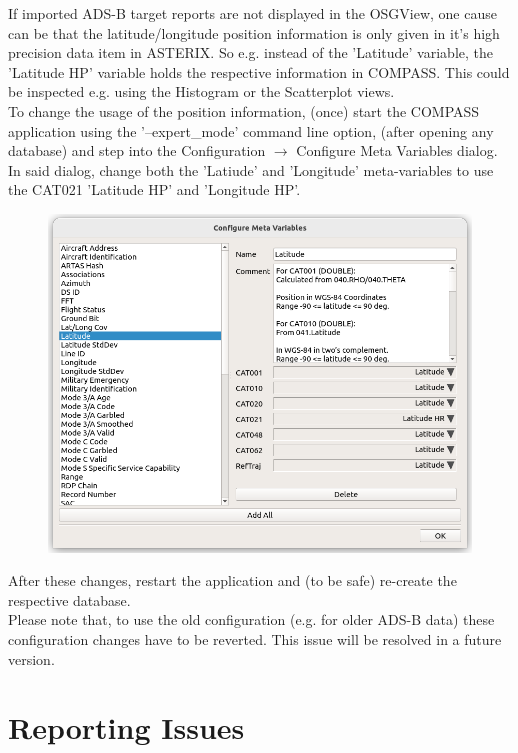 If imported ADS-B target reports are not displayed in the OSGView, one cause can be that the latitude/longitude position information is only given in it's high precision data item in ASTERIX. So e.g. instead of the 'Latitude' variable, the 'Latitude HP' variable holds the respective information in COMPASS. This could be inspected e.g. using the Histogram or the Scatterplot views. \\

To change the usage of the position information, (once) start the COMPASS application using the '--expert\_mode' command line option, (after opening any database) and step into the Configuration $\rightarrow$ Configure Meta Variables dialog. \\

In said dialog, change both the 'Latiude' and 'Longitude' meta-variables to use the CAT021 'Latitude HP' and 'Longitude HP'.

\begin{figure}[H]
    \includegraphics[width=12cm,frame]{figures/meta_latitude_hr.png}
\end{figure}

After these changes, restart the application and (to be safe) re-create the respective database. \\

Please note that, to use the old configuration (e.g. for older ADS-B data) these configuration changes have to be reverted. This issue will be resolved in a future version.



\section{Reporting Issues}

